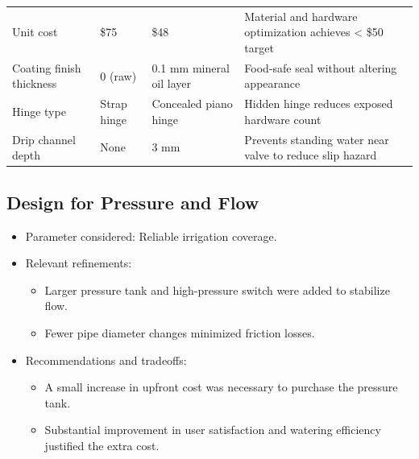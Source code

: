 \documentclass[12pt]{report}
\begin{document}
\begin{table}[h!]
{\begin{tabular}{p{3cm} p{2cm} p{2cm} p{8cm}}
      Unit cost                & \$75                   & \$48                       & Material and hardware optimization achieves < \$50 target            \\
      Coating finish thickness & 0 (raw)                & 0.1 mm mineral oil layer   & Food-safe seal without altering appearance                          \\
      Hinge type               & Strap hinge            & Concealed piano hinge      & Hidden hinge reduces exposed hardware count                          \\
      Drip channel depth       & None                   & 3 mm                       & Prevents standing water near valve to reduce slip hazard             \\
      \hline
    \end{tabular}%
  }
\end{table}

\subsection{Design for Pressure and Flow}
\begin{itemize}[leftmargin=1.5cm]
    \item Parameter considered: Reliable irrigation coverage.
    \item Relevant refinements:
    \begin{itemize}
        \item Larger pressure tank and high-pressure switch were added to stabilize flow.
        \item Fewer pipe diameter changes minimized friction losses.
    \end{itemize}
    \item Recommendations and tradeoffs:
    \begin{itemize}
        \item A small increase in upfront cost was necessary to purchase the pressure tank.
        \item Substantial improvement in user satisfaction and watering efficiency justified the extra cost.
    \end{itemize}
\end{itemize}
\end{document}
